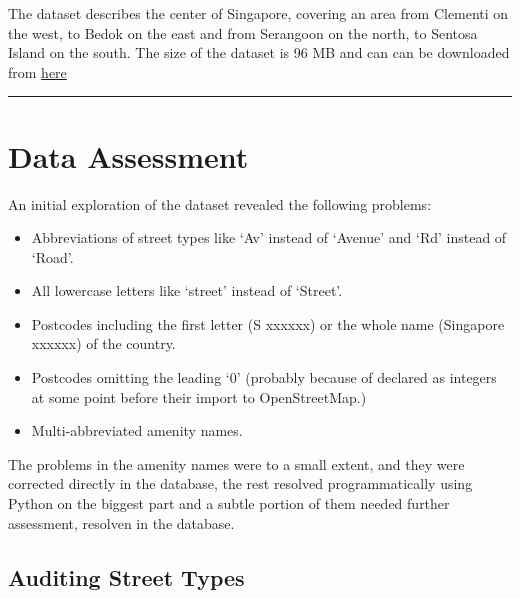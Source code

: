 \documentclass[11pt]{article}
\begin{document}
    

    The dataset describes the center of Singapore, covering an area from
Clementi on the west, to Bedok on the east and from Serangoon on the
north, to Sentosa Island on the south. The size of the dataset is 96 MB
and can can be downloaded from
\href{http://overpass-api.de/api/map?bbox=103.7651,1.2369,103.9310,1.3539}{here}\\

\begin{center}\color{brown}\rule{1\linewidth}{\linethickness}\end{center}


    \section*{Data Assessment}\label{data-assessment}

     An initial exploration of the dataset revealed the following problems:
\begin{itemize}
 \item Abbreviations of street types like `Av' instead of `Avenue' and `Rd'
instead of `Road'.
\end{itemize}
\begin{itemize}
 \item All lowercase letters like `street' instead of `Street'.
\end{itemize}
\begin{itemize}
 \item Postcodes including the first letter (S xxxxxx) or the whole name (Singapore xxxxxx) of the country.
\end{itemize}
\begin{itemize}
 \item Postcodes omitting the leading `0' (probably because of declared as integers at some point before their import to OpenStreetMap.)
\end{itemize}
\begin{itemize}
 \item Multi-abbreviated amenity names.
\end{itemize}
The problems in the amenity names were to a small extent, and they were
corrected directly in the database, the rest resolved programmatically
using Python on the biggest part and a subtle portion of them needed
further assessment, resolven in the database.


    \subsection*{Auditing Street Types}\label{auditing-street-types}
\end{document}
